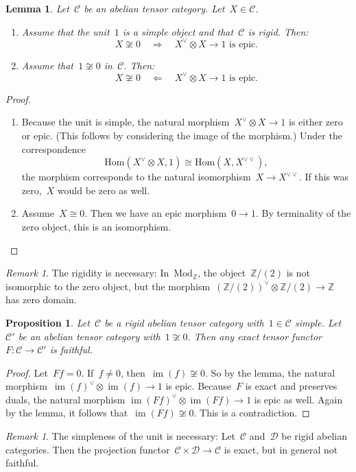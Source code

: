 \documentclass[a4paper,english,12pt]{scrartcl}
\theoremstyle{definition}
\theoremstyle{plain}
\newtheorem{prop}[defn]{Proposition}
\newtheorem{lemma}[defn]{Lemma}
\theoremstyle{remark}
\newtheorem{rem}[defn]{Remark}
\newcommand{\ZZ}{\mathbb{Z}}
\newcommand{\C}{\mathcal{C}}
\newcommand{\D}{\mathcal{D}}
\renewcommand{\_}{\mathpunct{.}\,}
\newcommand{\?}{\,{:}\,}
\newcommand{\Mod}{\mathrm{Mod}}
\renewcommand{\hom}{\mathrm{Hom}}
\newcommand{\im}{\operatorname{im}}
\begin{document}
\begin{lemma}Let~$\C$ be an abelian tensor category. Let~$X \in \C$.
\begin{enumerate}
\item Assume that the unit~$1$ is a simple object and that~$\C$ is rigid. Then:
\[ X \not\cong 0 \quad\Longrightarrow\quad
  \text{$X^\vee \otimes X \to 1$ is epic.} \]
\item Assume that~$1 \not\cong 0$ in~$\C$. Then:
\[ X \not\cong 0 \quad\Longleftarrow\quad
  \text{$X^\vee \otimes X \to 1$ is epic.} \]
\end{enumerate}
\end{lemma}
\begin{proof}
\begin{enumerate}
\item Because the unit is simple, the natural morphism~$X^\vee \otimes X \to 1$
is either zero or epic. (This follows by considering the image of the
morphism.) Under the correspondence
\[ \hom(X^\vee \otimes X,1) \cong \hom(X,X^{\vee\vee}), \]
the morphism corresponds to the natural isomorphism~$X \to X^{\vee\vee}$. If this
was zero,~$X$ would be zero as well.
\item Assume~$X \cong 0$. Then we have an epic morphism~$0 \to 1$. By
terminality of the zero object, this is an isomorphism.\qedhere
\end{enumerate}
\end{proof}

\begin{rem}The rigidity is necessary: In~$\Mod_\ZZ$, the object~$\ZZ/(2)$ is
not isomorphic to the zero object, but the morphism~$(\ZZ/(2))^\vee \otimes
\ZZ/(2) \to \ZZ$ has zero domain.\end{rem}

\begin{prop}Let~$\C$ be a rigid abelian tensor category with~$1 \in \C$ simple.
Let~$\C'$ be an abelian tensor category with~$1 \not\cong 0$. Then any exact
tensor functor~$F : \C \to \C'$ is faithful.\end{prop}
\begin{proof}Let~$Ff = 0$. If~$f \neq 0$, then~$\im(f) \not\cong 0$. So by the
lemma, the natural morphism~$\im(f)^\vee \otimes \im(f) \to 1$ is epic.
Because~$F$ is exact and preserves duals, the natural morphism
$\im(Ff)^\vee \otimes \im(Ff) \to 1$ is epic as well. Again by the lemma, it
follows that~$\im(Ff) \not\cong 0$. This is a contradiction.\end{proof}

\begin{rem}The simpleness of the unit is necessary: Let~$\C$ and~$\D$ be rigid abelian
categories. Then the projection functor~$\C \times \D \to \C$
is exact, but in general not faithful.\end{rem}
\end{document}
